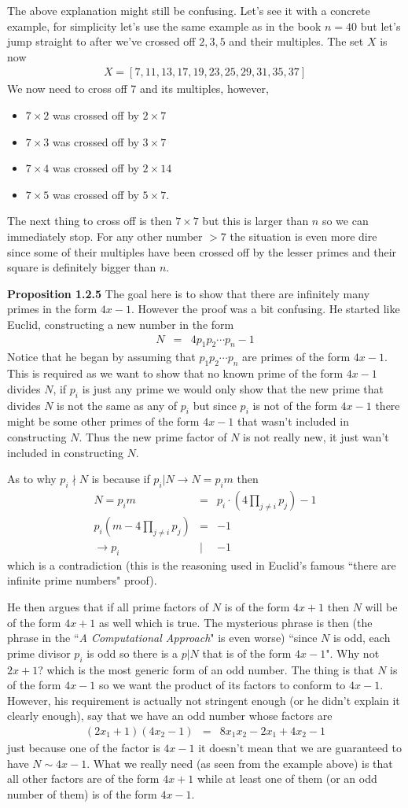 \documentclass[aps,preprint,preprintnumbers,nofootinbib,showpacs,prd]{revtex4-1}
\newcommand{\bit}{\begin{itemize}}
\newcommand{\eit}{\end{itemize}}
\newcommand{\nbea}{\begin{eqnarray*}}
\newcommand{\neea}{\end{eqnarray*}}
\begin{document}
The above explanation might still be confusing. Let's see it with a concrete example, for simplicity let's use the same example as in the book $n = 40$ but let's jump straight to after we've crossed off $2,3,5$ and their multiples. The set $X$ is now
%
\nbea
X=[7,11,13,17,19,23,25,29,31,35,37]
\neea
%
We now need to cross off $7$ and its multiples, however, 
\bit
\item $7 \times 2$ was crossed off by $2 \times 7$
\item $7 \times 3$ was crossed off by $3 \times 7$
\item $7 \times 4$ was crossed off by $2 \times 14$
\item $7 \times 5$ was crossed off by $5 \times 7$.
\eit
The next thing to cross off is then $7 \times 7$ but this is larger than $n$ so we can immediately stop. For any other number $> 7$ the situation is even more dire since some of their multiples have been crossed off by the lesser primes and their square is definitely bigger than $n$.

{\bf Proposition 1.2.5} The goal here is to show that there are infinitely many primes in the form $4x - 1$. However the proof was a bit confusing. He started like Euclid, constructing a new number in the form
%
\nbea
N & = & 4 p_1 p_2 \cdots p_n - 1
\neea
%
Notice that he began by assuming that $p_1 p_2 \cdots p_n$ are primes of the form $4x-1$. This is required as we want to show that no known prime of the form $4x-1$ divides $N$, if $p_i$ is just any prime we would only show that the new prime that divides $N$ is not the same as any of $p_i$ but since $p_i$ is not of the form $4x-1$ there might be some other primes of the form $4x-1$ that wasn't included in constructing $N$. Thus the new prime factor of $N$ is not really new, it just wan't included in constructing $N$.

As to why $p_i \nmid N$ is because if $p_i|N \to N = p_i m$ then
%
\nbea
N = p_i m & = & p_i \cdot (4 \prod_{j\neq i} p_j) - 1 \\
p_i (m - 4 \prod_{j\neq i} p_j) & = & -1 \\
\to p_i & | & -1
\neea
%
which is a contradiction (this is the reasoning used in Euclid's famous ``there are infinite prime numbers" proof).

He then argues that if all prime factors of $N$ is of the form $4x + 1$ then $N$ will be of the form $4x+1$ as well which is true. The mysterious phrase is then (the phrase in the ``{\it A Computational Approach}" is even worse) ``since $N$ is odd, each prime divisor $p_i$ is odd so there is a $p|N$ that is of the form $4x-1$". Why not $2x+1$? which is the most generic form of an odd number. The thing is that $N$ is of the form $4x-1$ so we want the product of its factors to conform to $4x-1$. However, his requirement is actually not stringent enough (or he didn't explain it clearly enough), say that we have an odd number whose factors are
%
\nbea
(2x_1 + 1)(4x_2 - 1) & = & 8 x_1 x_2 - 2x_1 + 4 x_2 - 1
\neea
%
just because one of the factor is $4x-1$ it doesn't mean that we are guaranteed to have $N \sim 4x-1$. What we really need (as seen from the example above) is that all other factors are of the form $4x+1$ while at least one of them (or an odd number of them) is of the form $4x-1$.
\end{document}
